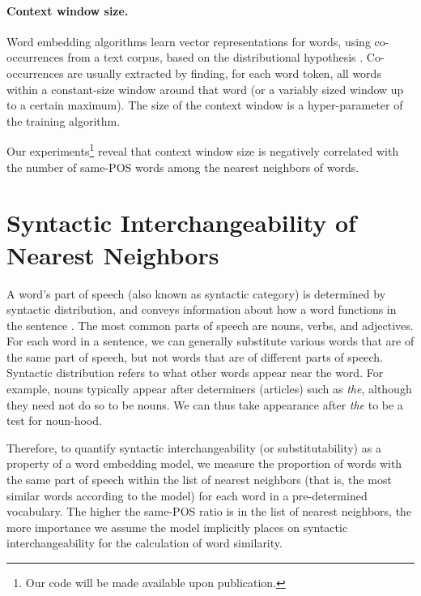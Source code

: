 \documentclass[11pt,a4paper]{article}
\begin{document}
    \paragraph{Context window size.}
    Word embedding algorithms learn vector representations for words,
    using co-occurrences from a text corpus,
    based on the distributional hypothesis \cite{harris1954distributional}.
    Co-occurrences are usually extracted by finding, for each word token, all
    words within a constant-size window around that word (or a variably sized
    window up to a certain maximum).
    The size of the context window is a hyper-parameter of the training algorithm.

    Our experiments\footnote{Our code will be made available upon publication.}
    reveal that context window size is negatively correlated
    with the number of same-POS words among the nearest neighbors of words.
    
    \section{Syntactic Interchangeability of Nearest Neighbors}\label{sec:nn}
    
    A word's part of speech (also known as syntactic category)
    is determined by syntactic distribution, and
    conveys information about how a word functions in the sentence \cite{carnie2002syntax}.
    The most common parts of speech are nouns, verbs, and adjectives.
    For each word in a sentence,
    we can generally substitute various words that are of the same part of speech,
    but not words that are of different parts of speech.
    Syntactic distribution refers to what other words appear
    near the word. For example, nouns typically appear after determiners (articles)
    such as \textit{the}, although they need not do so to be nouns. We can thus
    take appearance after \textit{the} to be a test for noun-hood.
    
    Therefore, to quantify syntactic interchangeability (or substitutability)
    as a property of a word embedding model,
    we measure the proportion of words with the same part of speech
    within the list of nearest neighbors
    (that is, the most similar words according to the model)
    for each word in a pre-determined vocabulary.
    The higher the same-POS ratio is in the list of nearest neighbors,
    the more importance we assume the model implicitly places on syntactic interchangeability
    for the calculation of word similarity.
    
\end{document}
